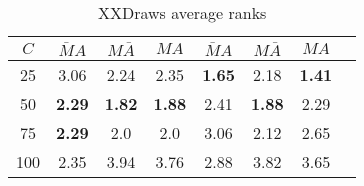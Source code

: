 
\begin{table*}[ht]
\centering
\small
\begin{tabular}{ c | c c c ||  c c c c }
 $C$& $\bar M A$ & $M \bar A$ & $MA$ & $\bar M A$ & $M \bar A$ & $MA$\\ \hline
 25 & 3.06 & 2.24 & 2.35 & \textbf{1.65} & 2.18 & \textbf{1.41} \\
 50 & \textbf{2.29} & \textbf{1.82} & \textbf{1.88} & 2.41 & \textbf{1.88} & 2.29 \\
 75 & \textbf{2.29} & 2.0 & 2.0 & 3.06 & 2.12 & 2.65 \\
 100 & 2.35 & 3.94 & 3.76 &2.88 & 3.82 & 3.65  \\
\end{tabular}
\caption{XXDraws average ranks}
\label{table:XXdraws_avg_ranks}
\end{table*}

